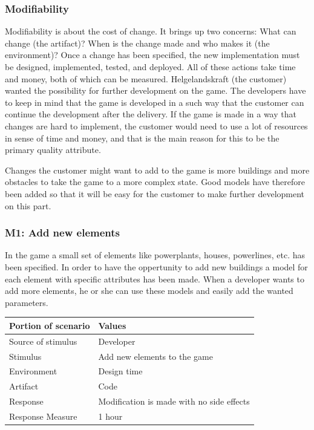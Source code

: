 \subsubsection{Modifiability}

Modifiability is about the cost of change. It brings up two concerns: What can change (the artifact)? 
When is the change made and who makes it (the environment)? 
Once a change has been specified, the new implementation must be designed, 
implemented, tested, and deployed. All of these actions take time and money, both of which can be measured.
Helgelandskraft (the customer) wanted the possibility for further development on the game. The developers
have to keep in mind that the game is developed in a such way that the customer can continue
the development after the delivery. If the game is made in a way that changes are hard to implement, 
the customer would need to use a lot of resources in sense of time and money, and that is the main 
reason for this to be the primary quality attribute.

Changes the customer might want to add to the game is more buildings and more obstacles to take
the game to a more complex state. Good models have therefore been added so that it will be easy for 
the customer to make further development on this part.

\subsubsection*{M1: Add new elements}
In the game a small set of elements like powerplants, houses, powerlines, etc. has been specified.
In order to have the oppertunity to add new buildings a model for each element with specific attributes has been made. When a developer wants to add more elements, he or she can use these models and easily add the wanted parameters. 

\begin{tabular}{| l | l |}
	\hline
	{\bf Portion of scenario} & {\bf Values} \\ \hline
	Source of stimulus & Developer\\ \hline
	Stimulus & Add new elements to the game\\ \hline
	Environment & Design time \\ \hline
	Artifact & Code \\ \hline
	Response & Modification is made with no side effects\\ \hline
	Response Measure & 1 hour\\ \hline
\end{tabular}

